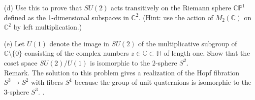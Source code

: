 \documentclass[11pt]{article}
\newcommand{\C}{\mathbb{C}}
\begin{document}
(d) Use this to prove that $SU(2)$ acts transitively on the Riemann
sphere $\mathbb{CP}^1$ defined as the 1-dimensional subspaces in $\C^2$. (Hint:
use the action of $M_2(\C)$ on $\C^2$  by left multiplication.)

(e) Let $U(1)$ denote the image in $SU(2)$ of the multiplicative subgroup
of $\C\setminus \{0\}$ consisting of the complex numbers $z\in \C\subset \mathbb H$  of length
one. Show that the coset space $SU(2)/U(1)$ is isomorphic to the
2-sphere $S^2$. \\

Remark. The solution to this problem gives a realization of the
Hopf fibration $S^3\to S^2$ with fibers $S^1$ because the group of unit
quaternions is isomorphic to the $3$-sphere $S^3$.
.
\end{document}
